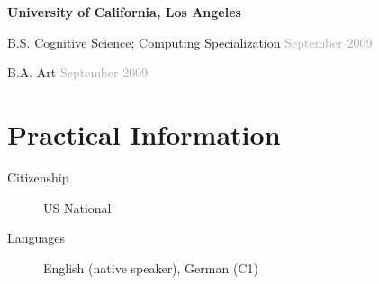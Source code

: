 \documentclass[margin,line]{res}
\newenvironment{list1}{
  \begin{list}{\ding{113}}{%
      \setlength{\itemsep}{0in}
      \setlength{\parsep}{0in} \setlength{\parskip}{0in}
      \setlength{\topsep}{0in} \setlength{\partopsep}{0in}
      \setlength{\leftmargin}{0.17in}}}{\end{list}}
\begin{document}
\begin{resume}
{\bf University of California, Los Angeles}\\
\begin{list1}
\item[] B.S. Cognitive Science; Computing Specialization \hfill \hfill \textcolor{darkgray}{September 2009}
\item[] B.A. Art \hfill \hfill \textcolor{darkgray}{September 2009}
\end{list1}

\section{\sc Practical Information}
\begin{description}
\item[Citizenship] US National
\item[Languages] English (native speaker), German (C1)
\end{description}




%



\end{resume}
\end{document}
